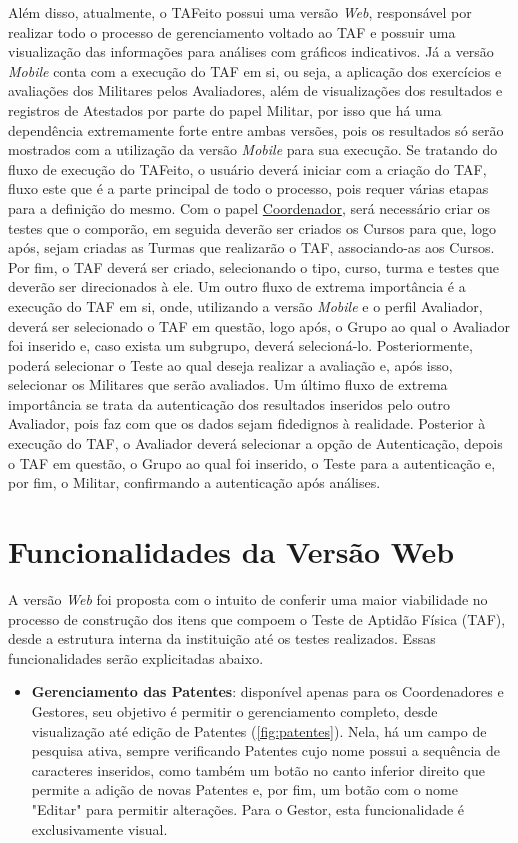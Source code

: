 Além disso, atualmente, o TAFeito possui uma versão \textit{Web}, responsável por realizar todo o processo de gerenciamento voltado ao TAF e possuir uma visualização das informações para análises com gráficos indicativos. Já a versão \textit{Mobile} conta com a execução do TAF em si, ou seja, a aplicação dos exercícios e avaliações dos Militares pelos Avaliadores, além de visualizações dos resultados e registros de Atestados por parte do papel Militar, por isso que há uma dependência extremamente forte entre ambas versões, pois os resultados só serão mostrados com a utilização da versão \textit{Mobile} para sua execução.
Se tratando do fluxo de execução do TAFeito, o usuário deverá iniciar com a criação do TAF, fluxo este que é a parte principal de todo o processo, pois requer várias etapas para a definição do mesmo. Com o papel \underline{Coordenador}, será necessário criar os testes que o comporão, em seguida deverão ser criados os Cursos para que, logo após, sejam criadas as Turmas que realizarão o TAF, associando-as aos Cursos. Por fim, o TAF deverá ser criado, selecionando o tipo, curso, turma e testes que deverão ser direcionados à ele. Um outro fluxo de extrema importância é a execução do TAF em si, onde, utilizando a versão \textit{Mobile} e o perfil Avaliador, deverá ser selecionado o TAF em questão, logo após, o Grupo ao qual o Avaliador foi inserido e, caso exista um subgrupo, deverá selecioná-lo. Posteriormente, poderá selecionar o Teste ao qual deseja realizar a avaliação e, após isso, selecionar os Militares que serão avaliados. Um último fluxo de extrema importância se trata da autenticação dos resultados inseridos pelo outro Avaliador, pois faz com que os dados sejam fidedignos à realidade. Posterior à execução do TAF, o Avaliador deverá selecionar a opção de Autenticação, depois o TAF em questão, o Grupo ao qual foi inserido, o Teste para a autenticação e, por fim, o Militar, confirmando a autenticação após análises.

\section{Funcionalidades da Versão Web}
\label{sec:funcionalidades_web}
A versão \textit{Web} foi proposta com o intuito de conferir uma maior viabilidade no processo de construção dos itens que compoem o Teste de Aptidão Física (TAF), desde a estrutura interna da instituição até os testes realizados. Essas funcionalidades serão explicitadas abaixo.

\begin{itemize}
	\item \label{item:gerenciar_patentes} \textbf{Gerenciamento das Patentes}: disponível apenas para os Coordenadores e Gestores, seu objetivo é permitir o gerenciamento completo, desde visualização até edição de Patentes (\autoref{fig:patentes}). Nela, há um campo de pesquisa ativa, sempre verificando Patentes cujo nome possui a sequência de caracteres inseridos, como também um botão no canto inferior direito que permite a adição de novas Patentes e, por fim, um botão com o nome "Editar" para permitir alterações. Para o Gestor, esta funcionalidade é exclusivamente visual.
\end{itemize}

